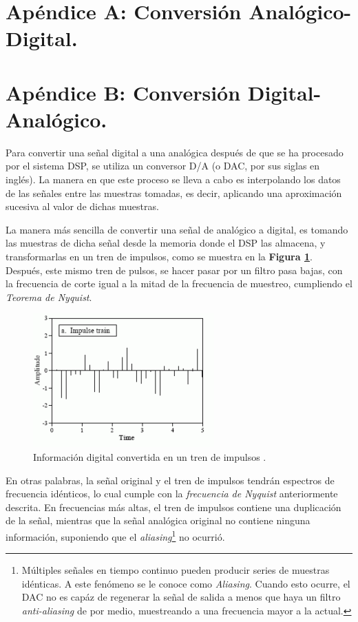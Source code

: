 
\part*{Ap\'{e}ndice A: Conversi\'{o}n Anal\'{o}gico-Digital.}

\newpage{}

\part*{Ap\'{e}ndice B: Conversi\'{o}n Digital-Anal\'{o}gico.}

Para convertir una se\~{n}al digital a una anal\'{o}gica despu\'{e}s
de que se ha procesado por el sistema DSP, se utiliza un conversor
D/A (o DAC, por sus siglas en ingl\'{e}s). La manera en que este proceso
se lleva a cabo es interpolando los datos de las se\~{n}ales entre
las muestras tomadas, es decir, aplicando una aproximaci\'{o}n sucesiva
al valor de dichas muestras.

La manera m\'{a}s sencilla de convertir una se\~{n}al de anal\'{o}gico
a digital, es tomando las muestras de dicha se\~{n}al desde la memoria
donde el DSP las almacena, y transformarlas en un tren de impulsos,
como se muestra en la \textbf{Figura \ref{fig:Informaci=0000F3n-digital-convertida-1}}.\textbf{
}Despu\'{e}s, este mismo tren de pulsos, se hacer pasar por un filtro
pasa bajas, con la frecuencia de corte igual a la mitad de la frecuencia
de muestreo, cumpliendo el \emph{Teorema de Nyquist}.

\begin{figure}[H]
\begin{centering}
\includegraphics[scale=0.8]{img/impulse_train}
\par\end{centering}
\caption{Informaci\'{o}n digital convertida en un tren de impulsos \label{fig:Informaci=0000F3n-digital-convertida-1}.\cite{New1}}
\end{figure}

En otras palabras, la se\~{n}al original y el tren de impulsos tendr\'{a}n
espectros de frecuencia id\'{e}nticos, lo cual cumple con la \emph{frecuencia
de Nyquist} anteriormente descrita. En frecuencias m\'{a}s altas,
el tren de impulsos contiene una duplicaci\'{o}n de la se\~{n}al,
mientras que la se\~{n}al anal\'{o}gica original no contiene ninguna
informaci\'{o}n, suponiendo que el \emph{aliasing}\footnote{M\'{u}ltiples se\~{n}ales en tiempo continuo pueden producir series
de muestras id\'{e}nticas. A este fen\'{o}meno se le conoce como \emph{Aliasing}.
Cuando esto ocurre, el DAC no es cap\'{a}z de regenerar la se\~{n}al
de salida a menos que haya un filtro \emph{anti-aliasing }de por medio,
muestreando a una frecuencia mayor a la actual\cite{EECS_247}.}\textbf{\emph{ }}no ocurri\'{o}.

